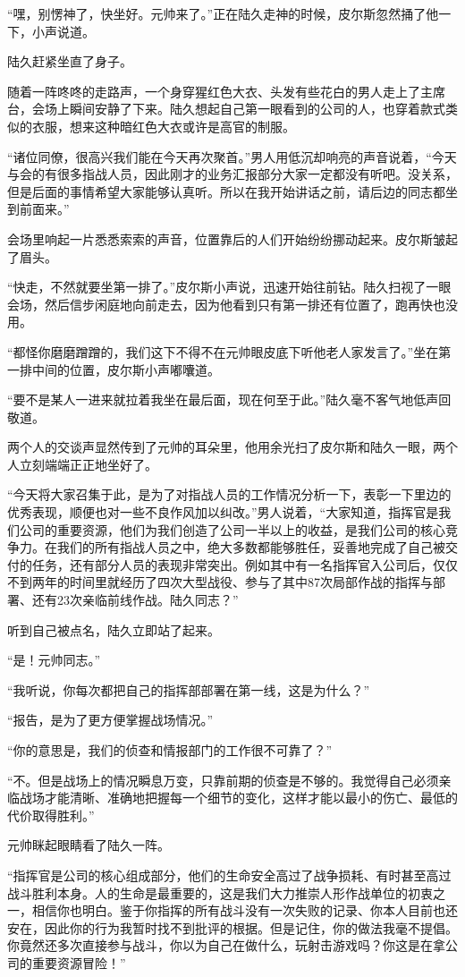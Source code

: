 “嘿，别愣神了，快坐好。元帅来了。”正在陆久走神的时候，皮尔斯忽然捅了他一下，小声说道。

陆久赶紧坐直了身子。

随着一阵咚咚的走路声，一个身穿猩红色大衣、头发有些花白的男人走上了主席台，会场上瞬间安静了下来。陆久想起自己第一眼看到的公司的人，也穿着款式类似的衣服，想来这种暗红色大衣或许是高官的制服。

“诸位同僚，很高兴我们能在今天再次聚首。”男人用低沉却响亮的声音说着，“今天与会的有很多指战人员，因此刚才的业务汇报部分大家一定都没有听吧。没关系，但是后面的事情希望大家能够认真听。所以在我开始讲话之前，请后边的同志都坐到前面来。”

会场里响起一片悉悉索索的声音，位置靠后的人们开始纷纷挪动起来。皮尔斯皱起了眉头。

“快走，不然就要坐第一排了。”皮尔斯小声说，迅速开始往前钻。陆久扫视了一眼会场，然后信步闲庭地向前走去，因为他看到只有第一排还有位置了，跑再快也没用。

“都怪你磨磨蹭蹭的，我们这下不得不在元帅眼皮底下听他老人家发言了。”坐在第一排中间的位置，皮尔斯小声嘟囔道。

“要不是某人一进来就拉着我坐在最后面，现在何至于此。”陆久毫不客气地低声回敬道。

两个人的交谈声显然传到了元帅的耳朵里，他用余光扫了皮尔斯和陆久一眼，两个人立刻端端正正地坐好了。

“今天将大家召集于此，是为了对指战人员的工作情况分析一下，表彰一下里边的优秀表现，顺便也对一些不良作风加以纠改。”男人说着，“大家知道，指挥官是我们公司的重要资源，他们为我们创造了公司一半以上的收益，是我们公司的核心竞争力。在我们的所有指战人员之中，绝大多数都能够胜任，妥善地完成了自己被交付的任务，还有部分人员的表现非常突出。例如其中有一名指挥官入公司后，仅仅不到两年的时间里就经历了四次大型战役、参与了其中87次局部作战的指挥与部署、还有23次亲临前线作战。陆久同志？”

听到自己被点名，陆久立即站了起来。

“是！元帅同志。”

“我听说，你每次都把自己的指挥部部署在第一线，这是为什么？”

“报告，是为了更方便掌握战场情况。”

“你的意思是，我们的侦查和情报部门的工作很不可靠了？”

“不。但是战场上的情况瞬息万变，只靠前期的侦查是不够的。我觉得自己必须亲临战场才能清晰、准确地把握每一个细节的变化，这样才能以最小的伤亡、最低的代价取得胜利。”

元帅眯起眼睛看了陆久一阵。

“指挥官是公司的核心组成部分，他们的生命安全高过了战争损耗、有时甚至高过战斗胜利本身。人的生命是最重要的，这是我们大力推崇人形作战单位的初衷之一，相信你也明白。鉴于你指挥的所有战斗没有一次失败的记录、你本人目前也还安在，因此你的行为我暂时找不到批评的根据。但是记住，你的做法我毫不提倡。你竟然还多次直接参与战斗，你以为自己在做什么，玩射击游戏吗？你这是在拿公司的重要资源冒险！”

